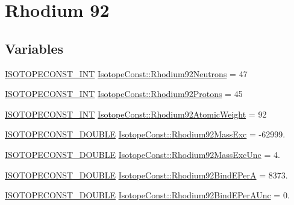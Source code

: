 \hypertarget{group___isotope_const-_rhodium-_rh92}{}\section{Rhodium 92}
\label{group___isotope_const-_rhodium-_rh92}
\subsection*{Variables}
\begin{DoxyCompactItemize}
\item 
\mbox{\hyperlink{group___isotope_const-_macros_ga5f18360b3e99483a35c32d789e62621c}{I\+S\+O\+T\+O\+P\+E\+C\+O\+N\+S\+T\+\_\+\+I\+NT}} \mbox{\hyperlink{group___isotope_const-_rhodium-_rh92_ga69efd7715ce01ab31851749eac34a332}{Isotope\+Const\+::\+Rhodium92\+Neutrons}} = 47
\item 
\mbox{\hyperlink{group___isotope_const-_macros_ga5f18360b3e99483a35c32d789e62621c}{I\+S\+O\+T\+O\+P\+E\+C\+O\+N\+S\+T\+\_\+\+I\+NT}} \mbox{\hyperlink{group___isotope_const-_rhodium-_rh92_ga570942b2ecc6a8ce3499cf2386780847}{Isotope\+Const\+::\+Rhodium92\+Protons}} = 45
\item 
\mbox{\hyperlink{group___isotope_const-_macros_ga5f18360b3e99483a35c32d789e62621c}{I\+S\+O\+T\+O\+P\+E\+C\+O\+N\+S\+T\+\_\+\+I\+NT}} \mbox{\hyperlink{group___isotope_const-_rhodium-_rh92_gad401e82266b1f95d2cf09016b86578e8}{Isotope\+Const\+::\+Rhodium92\+Atomic\+Weight}} = 92
\item 
\mbox{\hyperlink{group___isotope_const-_macros_ga8f45a7272ce02c0b4c65c44636ed719a}{I\+S\+O\+T\+O\+P\+E\+C\+O\+N\+S\+T\+\_\+\+D\+O\+U\+B\+LE}} \mbox{\hyperlink{group___isotope_const-_rhodium-_rh92_ga75c4c5c6243a8ede8a96f6d5b1d7e8f2}{Isotope\+Const\+::\+Rhodium92\+Mass\+Exc}} = -\/62999.
\item 
\mbox{\hyperlink{group___isotope_const-_macros_ga8f45a7272ce02c0b4c65c44636ed719a}{I\+S\+O\+T\+O\+P\+E\+C\+O\+N\+S\+T\+\_\+\+D\+O\+U\+B\+LE}} \mbox{\hyperlink{group___isotope_const-_rhodium-_rh92_gac14df2bd2e41dcfd75355ec3d5bfc8de}{Isotope\+Const\+::\+Rhodium92\+Mass\+Exc\+Unc}} = 4.
\item 
\mbox{\hyperlink{group___isotope_const-_macros_ga8f45a7272ce02c0b4c65c44636ed719a}{I\+S\+O\+T\+O\+P\+E\+C\+O\+N\+S\+T\+\_\+\+D\+O\+U\+B\+LE}} \mbox{\hyperlink{group___isotope_const-_rhodium-_rh92_gafd7906ce477bdb48907193cb864a94a0}{Isotope\+Const\+::\+Rhodium92\+Bind\+E\+PerA}} = 8373.
\item 
\mbox{\hyperlink{group___isotope_const-_macros_ga8f45a7272ce02c0b4c65c44636ed719a}{I\+S\+O\+T\+O\+P\+E\+C\+O\+N\+S\+T\+\_\+\+D\+O\+U\+B\+LE}} \mbox{\hyperlink{group___isotope_const-_rhodium-_rh92_ga23522be2d02d6cd8e070b522576d85f5}{Isotope\+Const\+::\+Rhodium92\+Bind\+E\+Per\+A\+Unc}} = 0.

\end{DoxyCompactItemize}

